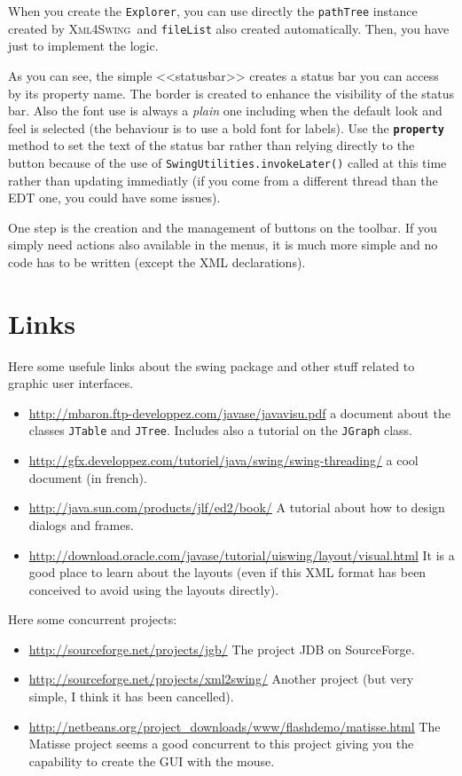 \documentclass[a4paper,onecolumn,10pt]{book}
\newcommand{\jmethod}[1]{\texttt{\small #1()}}
\newcommand{\jclass}[1]{\texttt{\small #1}}
\newcommand{\xmlswing}{\textsc{Xml4Swing}}
\newcommand{\tag}[1]{\textsf{<#1>}}
\newcommand{\attr}[1]{\texttt{\small \textbf{#1}}}
\begin{document}
When you create the \jclass{Explorer}, you can use directly the 
\verb|pathTree| instance created by \xmlswing\ and \verb|fileList| also
created automatically. Then, you have just to implement the logic.

As you can see, the simple \tag{<statusbar>} creates a status bar you can 
access by its property name. The border is created to enhance the visibility
of the status bar. Also the font use is always a \emph{plain} one including
when the default look and feel is selected (the behaviour is to use a bold
font for labels). Use the \attr{property} method to set the text of
the status bar rather than relying directly to the button because of the
use of \jmethod{SwingUtilities.invokeLater} called at this time
rather than updating immediatly (if you come from a different thread than
the EDT one, you could have some issues).

One step is the creation and the management of buttons on the toolbar.
If you simply need actions also available in the menus, it is much more
simple and no code has to be written (except the XML declarations).


\chapter{Links}
Here some usefule links about the swing package and
other stuff related to graphic user interfaces.

\begin{itemize}
	\item \url{http://mbaron.ftp-developpez.com/javase/javavisu.pdf}
		a document about the classes \jclass{JTable} and \jclass{JTree}.
		Includes also a tutorial on the \jclass{JGraph} class.
	\item \url{http://gfx.developpez.com/tutoriel/java/swing/swing-threading/}
	  a cool document (in french).
	\item \url{http://java.sun.com/products/jlf/ed2/book/} A tutorial
	  about how to design dialogs and frames.
  \item
    \url{http://download.oracle.com/javase/tutorial/uiswing/layout/visual.html}
    It is a good place to learn about the layouts (even if this XML format
    has been conceived to avoid using the layouts directly).   
\end{itemize}

Here some concurrent projects:
\begin{itemize}
   \item \url{http://sourceforge.net/projects/jgb/} The project JDB on
   SourceForge.
   \item \url{http://sourceforge.net/projects/xml2swing/} Another
   project (but very simple, I think it has been cancelled).
   \item \url{http://netbeans.org/project_downloads/www/flashdemo/matisse.html}
   The Matisse project seems a good concurrent to this project giving
   you the capability to create the GUI with the mouse.
\end{itemize}
\end{document}
